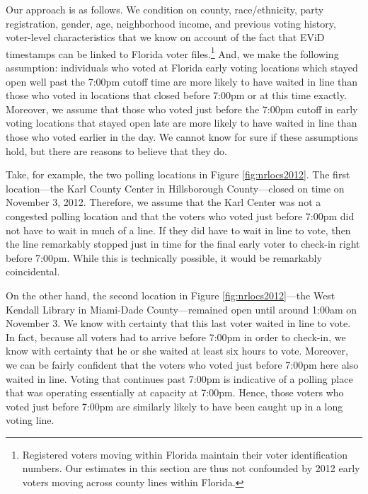 \documentclass[12pt,titlepage]{article}
\begin{document}
Our approach is as follows. We condition on county, race/ethnicity,
party registration, gender, age, neighborhood income, and previous
voting history, voter-level characteristics that we know on account of
the fact that EViD timestamps can be linked to Florida voter
files.\footnote{Registered voters
  moving within Florida maintain their voter identification numbers.
  Our estimates in this section are thus not
  confounded by 2012 early voters moving across county lines within
  Florida.} And, we make the following assumption: individuals who
voted at Florida early voting locations which stayed open well past
the 7:00pm cutoff time are more likely to have waited in line than
those who voted in locations that closed before 7:00pm or at this time
exactly. Moreover, we assume that those who voted just before the
7:00pm cutoff in early voting locations that stayed open late are more
likely to have waited in line than those who voted earlier in the day.
We cannot know for sure if these assumptions hold, but there are
reasons to believe that they do.

Take, for example, the two polling locations in Figure
\ref{fig:nrlocs2012}.  The first location---the Karl County Center in
Hillsborough County---closed on time on November 3, 2012.  Therefore,
we assume that the Karl Center was not a congested polling location
and that the voters who voted just before 7:00pm did not have to wait
in much of a line.  If they did have to wait in line to vote, then the
line remarkably stopped just in time for the final early voter to
check-in right before 7:00pm.  While this is technically possible, it
would be remarkably coincidental.

On the other hand, the second location in Figure
\ref{fig:nrlocs2012}---the West Kendall Library in Miami-Dade
County---remained open until around 1:00am on November 3.  We know
with certainty that this last voter waited in line to vote.  In fact,
because all voters had to arrive before 7:00pm in order to check-in,
we know with certainty that he or she waited at least six hours to
vote.  Moreover, we can be fairly confident that the voters who voted
just before 7:00pm here also waited in line.  Voting that continues
past 7:00pm is indicative of a polling place that was operating
essentially at capacity at 7:00pm.  Hence, those voters who voted just
before 7:00pm are similarly likely to have been caught up in a long
voting line.

 
\end{document}
